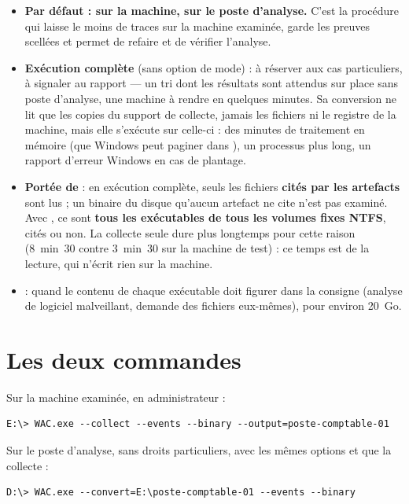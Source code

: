 \documentclass[11pt,a4paper,oneside]{report}
\begin{document}
\begin{itemize}
  \item \textbf{Par défaut :  sur la machine,  sur le
        poste d'analyse.} C'est la procédure qui laisse le moins de traces sur la
        machine examinée, garde les preuves scellées et permet de refaire et de
        vérifier l'analyse.
  \item \textbf{Exécution complète} (sans option de mode) : à réserver aux cas
        particuliers, à signaler au rapport — un tri dont les résultats sont
        attendus sur place sans poste d'analyse, une machine à rendre en quelques
        minutes. Sa conversion ne lit que les copies du support de collecte,
        jamais les fichiers ni le registre de la machine, mais elle s'exécute sur
        celle-ci : des minutes de traitement en mémoire (que Windows peut paginer
        dans ), un processus plus long, un rapport
        d'erreur Windows en cas de plantage.
  \item \textbf{Portée de } : en exécution complète, seuls les
        fichiers \textbf{cités par les artefacts} sont lus ; un binaire du disque
        qu'aucun artefact ne cite n'est pas examiné. Avec , ce sont
        \textbf{tous les exécutables de tous les volumes fixes NTFS}, cités ou non.
        La collecte seule dure plus longtemps pour cette raison (8~min~30
        contre 3~min~30 sur la machine de test) : ce temps est de la lecture,
        qui n'écrit rien sur la machine.
  \item \textbf{} : quand le contenu de chaque exécutable doit
        figurer dans la consigne (analyse de logiciel malveillant, demande des
        fichiers eux-mêmes), pour environ 20~Go.
\end{itemize}

\section{Les deux commandes}

Sur la machine examinée, en administrateur :
\begin{lstlisting}
E:\> WAC.exe --collect --events --binary --output=poste-comptable-01
\end{lstlisting}

Sur le poste d'analyse, sans droits particuliers, avec les mêmes options
 et  que la collecte :
\begin{lstlisting}
D:\> WAC.exe --convert=E:\poste-comptable-01 --events --binary
\end{lstlisting}
\end{document}
